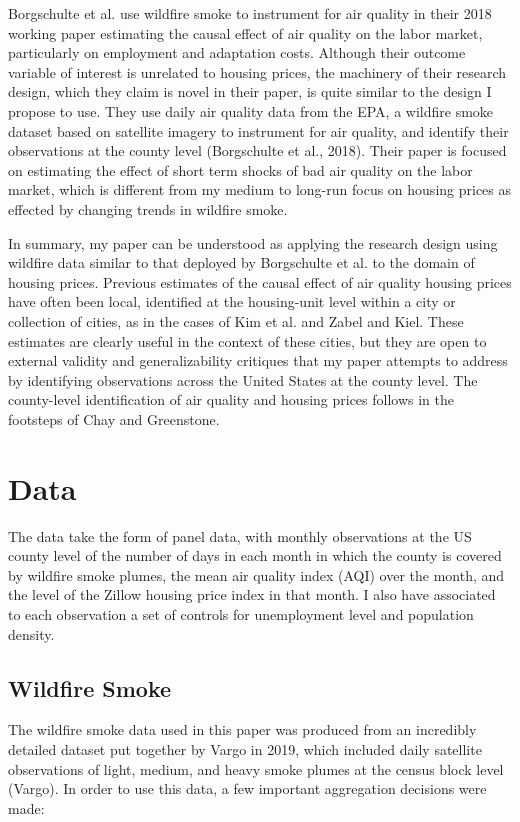 \documentclass[12pt]{article}
\begin{document}
Borgschulte et al. use wildfire smoke to instrument for air quality in their 2018 working paper estimating the causal effect of air quality on the labor market, particularly on employment and adaptation costs.  Although their outcome variable of interest is unrelated to housing prices, the machinery of their research design, which they claim is novel in their paper, is quite similar to the design I propose to use.  They use daily air quality data from the EPA, a wildfire smoke dataset based on satellite imagery to instrument for air quality, and identify their observations at the county level (Borgschulte et al., 2018).  Their paper is focused on estimating the effect of short term shocks of bad air quality on the labor market, which is different from my medium to long-run focus on housing prices as effected by changing trends in wildfire smoke.  

In summary, my paper can be understood as applying the research design using wildfire data similar to that deployed by Borgschulte et al. to the domain of housing prices.  Previous estimates of the causal effect of air quality housing prices have often been local, identified at the housing-unit level within a city or collection of cities, as in the cases of Kim et al. and Zabel and Kiel.  These estimates are clearly useful in the context of these cities, but they are open to external validity and generalizability critiques that my paper attempts to address by identifying observations across the United States at the county level.  The county-level identification of air quality and housing prices follows in the footsteps of Chay and Greenstone.  

\section{Data} 

The data take the form of panel data, with monthly observations at the US county level 
of the number of days in each month in which the county 
is covered by wildfire smoke plumes, the mean air quality index (AQI) over 
the month, and the level of the Zillow housing price index in that month.  
I also have associated to each observation a set of controls for
unemployment level and population density. 

\subsection{Wildfire Smoke}

The wildfire smoke data used in this paper was produced from an incredibly detailed dataset
put together by Vargo in 2019, which included daily satellite observations of light, 
medium, and heavy smoke plumes at the census block level (Vargo).  In order to use this data, a few important aggregation decisions were made:  
\end{document}
